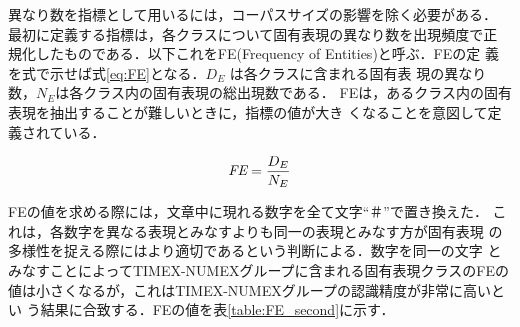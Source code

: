 異なり数を指標として用いるには，コーパスサイズの影響を除く必要がある．
最初に定義する指標は，各クラスについて固有表現の異なり数を出現頻度で正
規化したものである．以下これをFE(Frequency of Entities)と呼ぶ．FEの定
義を式で示せば式\ref{eq:FE}となる．\(D_E\) は各クラスに含まれる固有表
現の異なり数，\(N_E\)は各クラス内の固有表現の総出現数である．
FEは，あるクラス内の固有表現を抽出することが難しいときに，指標の値が大き
くなることを意図して定義されている．

\begin{equation}\label{eq:FE}
\mbox{\it FE} = \frac{D_E}{N_E}
\end{equation}

FEの値を求める際には，文章中に現れる数字を全て文字``＃''で置き換えた．
これは，各数字を異なる表現とみなすよりも同一の表現とみなす方が固有表現
の多様性を捉える際にはより適切であるという判断による．数字を同一の文字
とみなすことによってTIMEX-NUMEXグループに含まれる固有表現クラスのFEの
値は小さくなるが，これはTIMEX-NUMEXグループの認識精度が非常に高いとい
う結果に合致する．FEの値を表\ref{table:FE_second}に示す．

